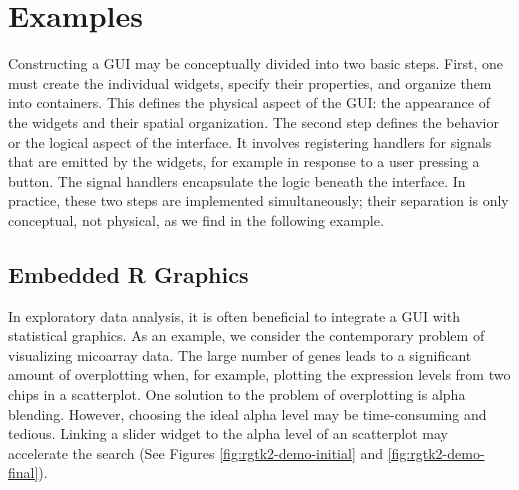 \documentclass[article]{jss}
\begin{document}
\section{Examples}

% 

Constructing a GUI may be conceptually divided into two basic steps.
First, one must create the individual widgets, specify their properties,
and organize them into containers. This defines the physical aspect
of the GUI: the appearance of the widgets and their spatial organization.
The second step defines the behavior or the logical aspect of the
interface. It involves registering handlers for signals that are emitted
by the widgets, for example in response to a user pressing a button.
The signal handlers encapsulate the logic beneath the interface. In
practice, these two steps are implemented simultaneously; their separation
is only conceptual, not physical, as we find in the following example.

\subsection{Embedded R Graphics}

In exploratory data analysis, it is often beneficial to integrate
a GUI with statistical graphics. As an example, we consider the contemporary
problem of visualizing micoarray data. The large number of genes leads
to a significant amount of overplotting when, for example, plotting
the expression levels from two chips in a scatterplot. One solution
to the problem of overplotting is alpha blending. However, choosing
the ideal alpha level may be time-consuming and tedious. Linking a
slider widget to the alpha level of an  scatterplot may accelerate
the search (See Figures \ref{fig:rgtk2-demo-initial} and \ref{fig:rgtk2-demo-final}). 
\end{document}
